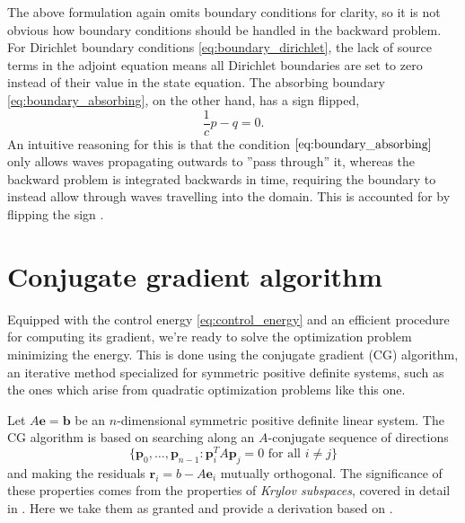 \documentclass[utf8,english]{gradu3}
\begin{document}
The above formulation again omits boundary conditions for clarity,
so it is not obvious how boundary conditions should be handled in the backward problem.
For Dirichlet boundary conditions \eqref{eq:boundary_dirichlet},
the lack of source terms in the adjoint equation means
all Dirichlet boundaries are set to zero instead of their value in the state equation.
The absorbing boundary \eqref{eq:boundary_absorbing}, on the other hand,
has a sign flipped,
\begin{equation}\label{eq:adjoint_boundary_absorbing}
  \frac{1}{c}p - q = 0.
\end{equation}
An intuitive reasoning for this is that the condition $\eqref{eq:boundary_absorbing}$
only allows waves propagating outwards to ''pass through'' it,
whereas the backward problem is integrated backwards in time,
requiring the boundary to instead allow through waves travelling into the domain.
This is accounted for by flipping the sign \parencite{givoli_tutorial_2021}.


\section{Conjugate gradient algorithm}

Equipped with the control energy \eqref{eq:control_energy}
and an efficient procedure for computing its gradient,
we're ready to solve the optimization problem minimizing the energy.
This is done using the conjugate gradient (CG) algorithm,
an iterative method specialized for symmetric positive definite systems,
such as the ones which arise from quadratic optimization problems like this one.

Let $A\mathbf{e} = \mathbf{b}$ be an $n$-dimensional symmetric positive definite linear system.
The CG algorithm is based on searching along an $A$-conjugate sequence of directions
\begin{equation}\label{eq:cg_search_directions}
  \{\mathbf{p}_0, \dots, \mathbf{p}_{n-1} : \mathbf{p}_i^T A \mathbf{p}_j = 0 \text{ for all } i \neq j\}
\end{equation}
and making the residuals $\mathbf{r}_i = b - A\mathbf{e}_i$ mutually orthogonal.
The significance of these properties comes from the properties of \textit{Krylov subspaces},
covered in detail in \parencite{saad_iterative_2003}.
Here we take them as granted and provide a derivation
based on \parencite[p. 199-200]{saad_iterative_2003}.
\end{document}
